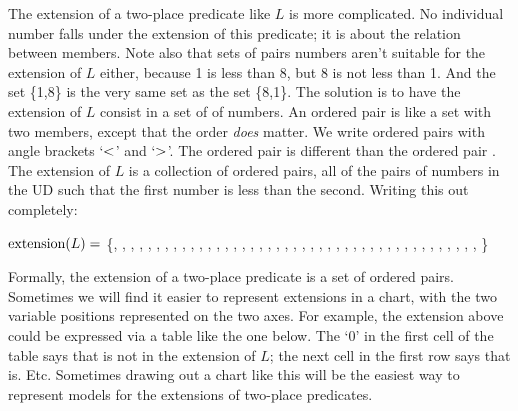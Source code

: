 The extension of a two-place predicate like $L$ is more complicated. No individual number falls under the extension of this predicate; it is about the relation between members. Note also that sets of pairs numbers aren't suitable for the extension of $L$ either, because 1 is less than 8, but 8 is not less than 1. And the set \{1,8\} is the very same set as the set \{8,1\}. The solution is to have the extension of $L$ consist in a set of  of numbers. An ordered pair is like a set with two members, except that the order \emph{does} matter. We write ordered pairs with angle brackets `$<$' and `$>$'. The ordered pair \mbox{} is different than the ordered pair \mbox{}. The extension of $L$ is a collection of ordered pairs, all of the pairs of numbers in the UD such that the first number is less than the second. Writing this out completely:

$\mbox{extension}(L)=$ \{, , , , , , , , ,
, , , , , , , ,
, , , , , , ,
, , , , , ,
, , , , ,
, , , , 
, , ,
, 
%
\}

Formally, the extension of a two-place predicate is a set of ordered pairs. Sometimes we will find it easier to represent extensions in a chart, with the two variable positions represented on the two axes. For example, the extension above could be expressed via a table like the one below. The `0' in the first cell of the table says that  is not in the extension of $L$; the next cell in the first row says that  is. Etc. Sometimes drawing out a chart like this will be the easiest way to represent models for the extensions of two-place predicates.


